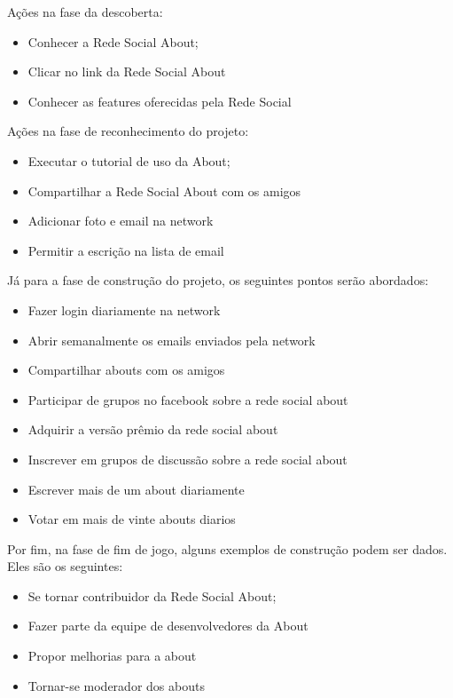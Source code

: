 Ações na fase da descoberta:
\begin{itemize}
    \item Conhecer a Rede Social About;
    \item Clicar no link da Rede Social About
    \item Conhecer as features oferecidas pela Rede Social
\end{itemize}


Ações na fase de reconhecimento do projeto: 
\begin{itemize}
    \item Executar o tutorial de uso da About;
    \item Compartilhar a Rede Social About com os amigos
    \item Adicionar foto e email na network
    \item Permitir a escrição na lista de email
\end{itemize}

Já para a fase de construção do projeto, os seguintes pontos serão
abordados:

\begin{itemize}
    \item Fazer login diariamente na network
    \item Abrir semanalmente os emails enviados pela network
    \item Compartilhar abouts com os amigos
    \item Participar de grupos no facebook sobre a rede social about
    \item Adquirir a versão prêmio da rede social about
    \item Inscrever em grupos de discussão sobre a rede social about
    \item Escrever mais de um about diariamente
    \item Votar em mais de vinte abouts diarios
\end{itemize}

Por fim, na fase de fim de jogo, alguns exemplos de construção podem ser dados. Eles são os seguintes:
\begin{itemize}
    \item Se tornar contribuidor da Rede Social About;
    \item Fazer parte da equipe de desenvolvedores da About
    \item Propor melhorias para a about
    \item Tornar-se moderador dos abouts
\end{itemize}

